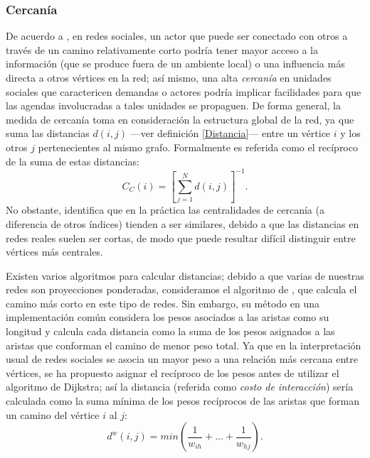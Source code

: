 \documentclass[letterpaper, 11pt]{book}
\theoremstyle{definition}
\theoremstyle{remark}
\begin{document}
\subsubsection{Cercanía}
De acuerdo a \citet{2010_Newman_Networks}, en redes sociales, un actor que puede ser conectado con otros a través de un camino relativamente corto podría tener mayor acceso a la información (que se produce fuera de un ambiente local) o una influencia más directa a otros vértices en la red; así mismo, una alta \emph{cercanía} en unidades sociales que caractericen demandas o actores podría implicar facilidades para que las agendas involucradas a tales unidades se propaguen. 
De forma general, la medida de cercanía toma en consideración la estructura global de la red, ya que suma las distancias $d(i,j)$ ---ver definición \ref{Distancia}--- entre un vértice $i$ y los otros $j$ pertenecientes al mismo grafo. 
Formalmente es referida como el recíproco de la suma de estas distancias:
\begin{equation}\label{eq:cercania_simple}
    C_{C}(i) = \left[ \sum_{j=1}^{N} d(i,j) \right]^{-1}.
\end{equation}
No obstante, \citet{2010_Newman_Networks} identifica que en la práctica las centralidades de cercanía (a diferencia de otros índices) tienden a ser similares, debido a que las distancias en redes reales suelen ser cortas, de modo que puede resultar difícil distinguir entre vértices más centrales. 


Existen varios algoritmos para calcular distancias; debido a que varias de nuestras redes son proyecciones ponderadas, consideramos el algoritmo de 
\citet{1959_Dijkstra_TwoProblems}, que calcula el camino más corto en este tipo de redes. 
Sin embargo, su método en una implementación común considera los pesos asociados a las aristas como su longitud y calcula cada distancia como la suma de los pesos asignados a las aristas que conforman el camino de menor peso total. 
Ya que en la interpretación usual de redes sociales se asocia un mayor peso a una relación más cercana entre vértices, se ha propuesto asignar el recíproco de los pesos antes de utilizar el algoritmo de Dijkstra; así la distancia (referida como \emph{costo de interacción}) sería calculada como la suma mínima de los pesos recíprocos de las aristas que forman un camino del vértice $i$ al $j$:
\begin{equation}\label{eq:distanciaPonderada}
    d^{w}(i,j) = min\left( \frac{1}{w_{ih}}+...+ \frac{1}{w_{hj}} \right).
\end{equation}
\end{document}
